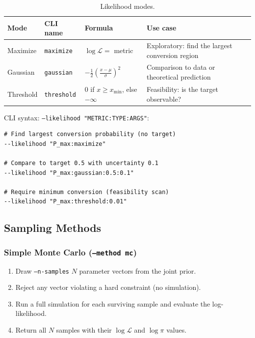 \begin{table}[htbp]
\centering
\caption{Likelihood modes.}
\label{tab:likelihood}
\begin{tabular}{@{}llll@{}}
\toprule
Mode        & CLI name     & Formula & Use case \\
\midrule
Maximize    & \texttt{maximize}   & $\log\mathcal{L} = $ metric      & Exploratory: find the largest conversion region \\
Gaussian    & \texttt{gaussian}   & $-\tfrac{1}{2}\!\left(\frac{x-\mu}{\sigma}\right)^{\!2}$ & Comparison to data or theoretical prediction \\
Threshold   & \texttt{threshold}  & $0$ if $x \geq x_\mathrm{min}$, else $-\infty$ & Feasibility: is the target observable? \\
\bottomrule
\end{tabular}
\end{table}

CLI syntax: \texttt{--likelihood "METRIC:TYPE:ARGS"}:

\begin{lstlisting}[style=bash]
# Find largest conversion probability (no target)
--likelihood "P_max:maximize"

# Compare to target 0.5 with uncertainty 0.1
--likelihood "P_max:gaussian:0.5:0.1"

# Require minimum conversion (feasibility scan)
--likelihood "P_max:threshold:0.01"
\end{lstlisting}

\subsection{Sampling Methods}
\label{sec:inference-sampling}

\subsubsection{Simple Monte Carlo (\texttt{--method mc})}
\label{sec:inference-mc}

\begin{enumerate}
  \item Draw \texttt{--n-samples} $N$ parameter vectors from the joint prior.
  \item Reject any vector violating a hard constraint (no simulation).
  \item Run a full simulation for each surviving sample and evaluate the log-likelihood.
  \item Return all $N$ samples with their $\log\mathcal{L}$ and $\log\pi$ values.
\end{enumerate}

